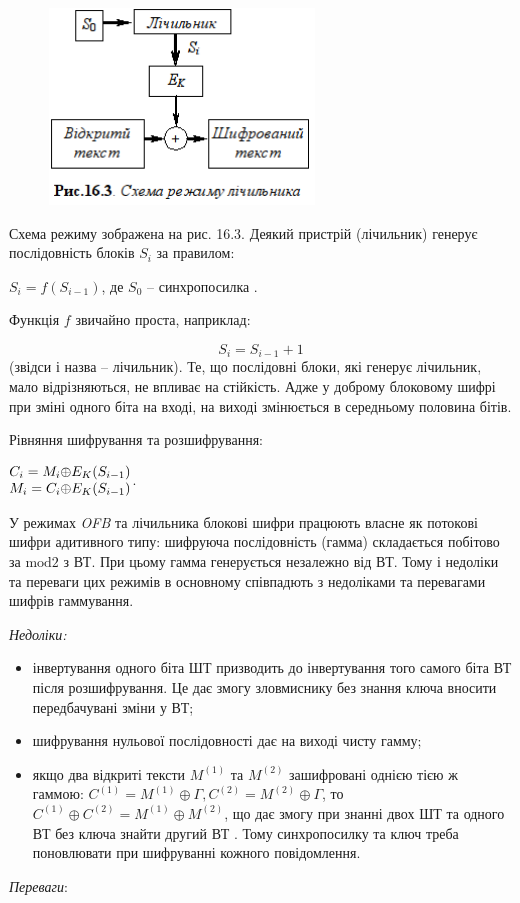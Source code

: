 \documentclass[a4paper]{article}
\newcommand\liststyleWWviiiNumxliv{%
\renewcommand\labelitemi{\textlatin{[F0B7?]}}
\renewcommand\labelitemii{o}
\renewcommand\labelitemiii{\textlatin{[F0A7?]}}
\renewcommand\labelitemiv{\textlatin{[F0B7?]}}
}
\newcounter{}
\begin{document}
\begin{figure}
\centering
\includegraphics[width=2.7709in,height=2.052in]{crypt-img/crypt-img339.png}
\end{figure}
Схема режиму зображена на рис. 16.3. Деякий пристрій (лічильник) генерує
послідовність блоків  ${S_{{i}}}$ за правилом: 

{\centering
 ${S_{{i}}=f(S_{{i-1}})}$, де  ${S_{{0}}}$ – синхропосилка .
\par}

Функція  ${f}$ звичайно проста, наприклад:

\begin{equation*}
{S_{{i}}=S_{{i-1}}+1}
\end{equation*}
(звідси і назва – лічильник). Те, що послідовні блоки, які генерує лічильник,
мало відрізняються, не впливає на стійкість. Адже у доброму блоковому шифрі при
зміні одного біта на вході, на виході змінюється в середньому половина бітів.

Рівняння шифрування та розшифрування:

{\centering
 $\begin{matrix}{C_{{i}}=M_{{i}}{\oplus}E_{{K}}(S_{{i-1}})}\hfill\null
\\M_{{i}}=C_{{i}}{\oplus}E_{{K}}(S_{{i-1}})\hfill\null \end{matrix}\hfill $.
\par}

У режимах \textit{OFB}\textit{ }та лічильника блокові шифри працюють власне як
потокові шифри адитивного типу: шифруюча послідовність (гамма) складається
побітово за  ${\text{mod}2}$ з ВТ. При цьому гамма генерується незалежно від
ВТ. Тому і недоліки та переваги цих режимів в основному співпадють з недоліками
та перевагами шифрів гаммування.

{\itshape
Недоліки:}

\liststyleWWviiiNumxliv
\begin{itemize}
\item інвертування одного біта ШТ призводить до інвертування того самого біта ВТ
після розшифрування. Це дає змогу зловмиснику без знання ключа вносити
передбачувані зміни у ВТ;
\item шифрування нульової послідовності дає на виході чисту гамму;
\item якщо два відкриті тексти  ${M^{{(1)}}}$ та  ${M^{{(2)}}}$ зашифровані
однією тією ж гаммою:  ${C^{{(1)}}=M^{{(1)}}{\oplus}\Gamma
,C^{{(2)}}=M^{{(2)}}{\oplus}\Gamma }$, то 
${C^{{(1)}}{\oplus}C^{{(2)}}=M^{{(1)}}{\oplus}M^{{(2)}}}$, що дає змогу при
знанні двох ШТ та одного ВТ без ключа знайти другий ВТ . Тому синхропосилку та
ключ треба поновлювати при шифруванні кожного повідомлення.
\end{itemize}
\textit{Переваги}:
\end{document}
